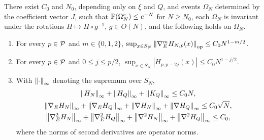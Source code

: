 \begin{lemma}\label{lem:ent-regularity}
There exist $C_0$ and $N_0$, depending only on $\xi$ and $Q$, and events
$\Omega_N$ determined by the coefficient vector $J$, such that
$\mathbb P(\Omega_N^c)\le e^{-N}$ for $N\ge N_0$, each $\Omega_N$ is invariant under
the rotations $H\mapsto H\circ g^{-1}$, $g\in O(N)$, and the following holds
on $\Omega_N$.
\begin{enumerate}
\item For every $p\in\mathcal P$ and $m\in\{0,1,2\}$,
$\sup_{x\in S_N}\left\lVert\nabla_E^mH_{N,p}(x)\right\rVert_{\rm op}\le C_0N^{1-m/2}$.
\item For every $p\in\mathcal P$ and $0\le j\le p/2$,
$\sup_{x\in S_N}|H_{p,p-2j}(x)|\le C_0N^{1-j/2}$.
\item With $\left\lVert\cdot\right\rVert_\infty$ denoting the supremum over $S_N$,
\begin{equation}\label{eq:ent-regularity}
 \begin{gathered}
 \left\lVert H_N\right\rVert_\infty+\left\lVert H_Q\right\rVert_\infty+\left\lVert K_Q\right\rVert_\infty\le C_0N,\\
 \left\lVert\nabla_EH_N\right\rVert_\infty+\left\lVert\nabla_EH_Q\right\rVert_\infty
   +\left\lVert\nabla H_N\right\rVert_\infty+\left\lVert\nabla H_Q\right\rVert_\infty\le C_0\sqrt N,\\
 \left\lVert\nabla_E^2H_N\right\rVert_\infty+\left\lVert\nabla_E^2H_Q\right\rVert_\infty
   +\left\lVert\nabla^2H_N\right\rVert_\infty+\left\lVert\nabla^2H_Q\right\rVert_\infty\le C_0,
 \end{gathered}
\end{equation}
where the norms of second derivatives are operator norms.
\end{enumerate}
\end{lemma}

